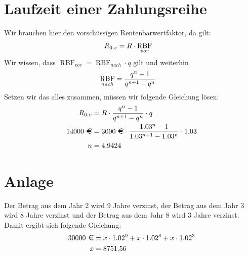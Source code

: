 \documentclass{article}
\DeclareMathOperator{\RBF}{RBF}
\begin{document}
	\section*{Laufzeit einer Zahlungsreihe}
	Wir brauchen hier den vorschüssigen Rentenbarwertfaktor, da gilt:
	\begin{align}
		R_{0,v} &= R\cdot \RBF_{vor} \notag
	\end{align}
	Wir wissen, dass $\RBF_{vor} = \RBF_{nach} \cdot q$ gilt und weiterhin
	\begin{align}
		\RBF_{nach} &= \frac{q^n-1}{q^{n+1}-q^n} \notag
	\end{align}
	Setzen wir das alles zusammen, müssen wir folgende Gleichung lösen:
	\begin{align}
		R_{0,v} &= R\cdot \frac{q^n-1}{q^{n+1}-q^n} \cdot q \notag \\
		14000\text{ \EUR} &= 3000\text{ \EUR} \cdot \frac{1.03^n-1}{1.03^{n+1}-1.03^n} \cdot 1.03 \notag \\
		n &= 4.9424 \notag
	\end{align}

	\section*{Anlage}
	Der Betrag aus dem Jahr 2 wird 9 Jahre verzinst, der Betrag aus dem Jahr 3 wird 8 Jahre verzinst und der Betrag aus dem Jahr 8 wird 3 Jahre verzinst. Damit ergibt sich folgende Gleichung:
	\begin{align}
		30000\text{ \EUR} &= x\cdot 1.02^9 + x\cdot 1.02^8 + x\cdot 1.02^3 \notag \\
		x &= 8751.56\notag
	\end{align}
	
\end{document}
